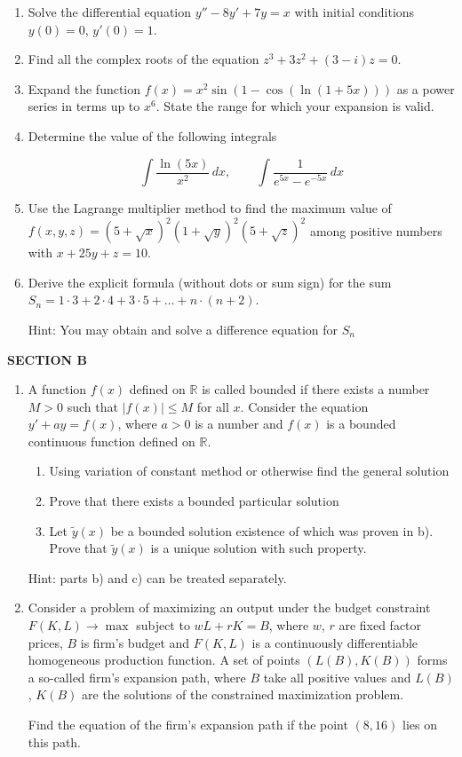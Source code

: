 \documentclass[12pt]{article}
\begin{document}
\begin{enumerate}
\item Solve the differential equation $y''-8y'+7y=x$ with initial conditions $y(0)=0$, $y'(0)=1$. 



\item Find all the complex roots of the equation $z^3+3z^2+(3-i)z=0$. 


\item Expand the function $f(x)=x^2\sin(1-\cos(\ln(1+5x)))$  as a power series in terms up to $x^6$. State the range for which your expansion is valid.

\item Determine the value of the following integrals

\[ 
\int \frac{\ln (5x)}{x^2} \, dx, \qquad \int \frac{1}{e^{5x}-e^{-5x}} \, dx
\]

\item Use the Lagrange multiplier method to find the maximum value of $f(x,y,z)=(5+\sqrt{x})^2(1+\sqrt{y})^2(5+\sqrt{z})^2$ among positive numbers with $x+25y+z=10$.


\item Derive the explicit formula (without dots or sum sign) for the sum $S_n=1\cdot 3+2\cdot 4+3\cdot 5 +\ldots+ n\cdot (n+2)$.

Hint: You may obtain and solve a difference equation for $S_n$


\end{enumerate}

\textbf{SECTION B}

\begin{enumerate}[resume]
\item A function $f(x)$ defined on $\mathbb{R}$ is called bounded if there exists a number $M>0$ such that $|f(x)| \leq M$ for all $x$. Consider the equation $y'+ ay = f (x)$, where $a>0$ is a number and $f (x)$  is a bounded continuous function defined on $\mathbb{R}$.
\begin{enumerate}
\item Using variation of constant method or otherwise find the general solution 
\item  Prove that there exists a bounded particular solution 
\item Let $\tilde{y}(x)$  be a bounded solution existence of which was proven in b). Prove that $\tilde{y}(x)$ is a unique solution with such property. 
\end{enumerate}
Hint: parts b) and c) can be treated separately.


\item Consider a problem of maximizing an output under the budget constraint $F(K,L) \to \max$ subject to $wL+rK=B$, where $w$, $r$ are fixed factor prices, $B$ is firm's budget and $F(K,L)$ is a continuously differentiable homogeneous production function. A set of points $(L(B),K(B))$ forms a so-called firm's expansion path, where $B$ take all positive values and $L(B)$, $K(B)$ are the solutions of the constrained maximization problem.

Find the equation of the firm's expansion path if the point $(8,16)$ lies on this path.
\end{enumerate}
\end{document}
